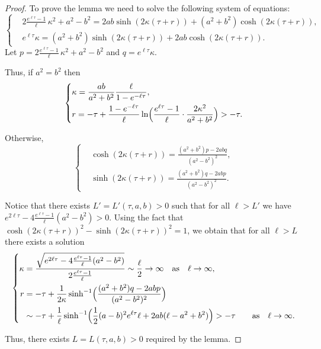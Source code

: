\documentclass[10pt]{amsart}
\theoremstyle{definition}
\renewcommand{\>}{{\rangle}}
\newcommand{\<}{{\langle}}
\begin{document}
\begin{proof}
To prove the lemma we need to solve the following system of equations:\vspace*{-3pt}
\begin{equation*}
\left\{
\begin{aligned}
&2\frac{e^{\ell \tau}-1}{\ell}\,\kappa^2+a^2-b^2 = 2ab\sinh(2\kappa(\tau+r))+(a^2+b^2)\cosh(2\kappa(\tau+r)),\\
& e^{\ell\tau}\kappa = (a^2+b^2)\sinh(2\kappa(\tau+r))+2 ab\cosh(2\kappa(\tau+r)).
\end{aligned}
\right.
\end{equation*}
Let $p=2\frac{e^{\ell \tau}-1}{\ell}\,\kappa^2+a^2-b^2$ and $q=e^{\ell\tau}\kappa$.

Thus, if $a^2=b^2$ then
\begin{equation*}
\left\{
\begin{aligned}
&\kappa = \frac{ab}{a^2+b^2}\frac{\ell}{1-e^{-\ell\tau}}, \\
& r = -\tau+\frac{1-e^{-\ell\tau}}{\ell}\ln\Bigl(\frac{e^{\ell\tau}-1}{\ell}\cdot\frac{2\kappa^2}{a^2+b^2}\Bigr)>-\tau.
\end{aligned}
\right.
\end{equation*}

Otherwise,
\begin{equation*}
\left\{
\begin{aligned}
&\cosh(2\kappa(\tau+r)) = \frac{(a^2+b^2)p-2abq}{(a^2-b^2)^2}, \\
&\sinh(2\kappa(\tau+r)) = \frac{(a^2+b^2)q-2abp}{(a^2-b^2)^2}.
\end{aligned}
\right.
\end{equation*}

Notice that there exists $L'=L'(\tau, a, b)>0$ such that for all $\ell>L'$ we have $e^{2\ell\tau}-4\frac{e^{\ell\tau}-1}{\ell}(a^2-b^2)>0$. Using the fact that $\cosh(2\kappa(\tau+r))^2-\sinh(2\kappa(\tau+r))^2=1$, we obtain that for all $\ell>L$ there exists a solution
\begin{equation*}
\left\{
\begin{aligned}
\kappa &= \frac{\sqrt{e^{2\ell\tau}-4\frac{e^{\ell\tau}-1}{\ell}(a^2-b^2)}}{2\frac{e^{\ell\tau}-1}{\ell}}\sim\frac{\ell}{2}\to \infty \quad \text{as}\quad \ell\to\infty, \\
r &=-\tau+\frac{1}{2\kappa} \sinh^{-1} \Bigl(\frac{(a^2+b^2)q-2abp}{(a^2-b^2)^2} \Bigr)\\&\sim-\tau+\frac{1}{\ell}\sinh^{-1} \Bigl(\frac{1}{2}(a-b)^2e^{\ell\tau}\ell+2ab(\ell-a^2+b^2) \Bigr)>-\tau\quad \quad \text{as}\quad \ell\to\infty.
\end{aligned}
\right.
\end{equation*}

Thus, there exists $L=L(\tau,a,b)>0$ required by the lemma.
\end{proof}
\end{document}
